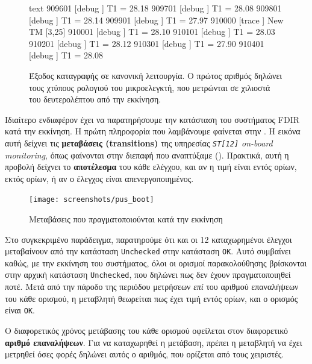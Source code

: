 \documentclass[a4paper,nobib]{tufte-book}
\begin{document}
\begin{figure}
\begin{cminted}{text}
909601  [debug  ] T1 = 28.18
909701  [debug  ] T1 = 28.08
909801  [debug  ] T1 = 28.14
909901  [debug  ] T1 = 27.97
910000  [trace  ] New TM [3,25]
910001  [debug  ] T1 = 28.10
910101  [debug  ] T1 = 28.03
910201  [debug  ] T1 = 28.12
910301  [debug  ] T1 = 27.90
910401  [debug  ] T1 = 28.08
\end{cminted}
\caption[Έξοδος καταγραφής σε κανονική λειτουργία]{Έξοδος καταγραφής σε κανονική λειτουργία. Ο πρώτος αριθμός δηλώνει τους χτύπους ρολογιού του μικροελεγκτή, που μετρώνται σε χιλιοστά του δευτερολέπτου από την εκκίνηση.}
\label{fig:lognominal}
\end{figure}

Ιδιαίτερο ενδιαφέρον έχει να παρατηρήσουμε την κατάσταση του συστήματος \acs{FDIR} κατά την εκκίνηση. Η πρώτη πληροφορία που λαμβάνουμε φαίνεται στην . Η εικόνα αυτή δείχνει τις \textbf{μεταβάσεις (transitions)} της υπηρεσίας \emph{\texttt{ST[12]} on-board monitoring}, όπως φαίνονται στην διεπαφή που αναπτύξαμε (). Πρακτικά, αυτή η προβολή δείχνει το \textbf{αποτέλεσμα} του κάθε ελέγχου, και αν η τιμή είναι εντός ορίων, εκτός ορίων, ή αν ο έλεγχος είναι απενεργοποιημένος.

\begin{figure}
	\texttt{[image: screenshots/pus\_boot]}
	\caption{Μεταβάσεις που πραγματοποιούνται κατά την εκκίνηση}
	\label{fig:pus_boot}
\end{figure}

Στο συγκεκριμένο παράδειγμα, παρατηρούμε ότι και οι 12 καταχωρημένοι έλεγχοι μεταβαίνουν από την κατάσταση \texttt{Unchecked} στην κατάσταση \texttt{OK}. Αυτό συμβαίνει καθώς, με την εκκίνηση του συστήματος, όλοι οι ορισμοί παρακολούθησης βρίσκονται στην αρχική κατάσταση \texttt{Unchecked}, που δηλώνει πως δεν έχουν πραγματοποιηθεί ποτέ. Μετά από την πάροδο της περιόδου μετρήσεων \emph{επί} του αριθμού επαναλήψεων του κάθε ορισμού, η μεταβλητή θεωρείται πως έχει τιμή εντός ορίων, και ο ορισμός είναι \texttt{OK}.

Ο διαφορετικός χρόνος μετάβασης του κάθε ορισμού οφείλεται στον διαφορετικό \textbf{αριθμό επαναλήψεων}. Για να καταχωρηθεί η μετάβαση, πρέπει η μεταβλητή να έχει μετρηθεί όσες φορές δηλώνει αυτός ο αριθμός, που ορίζεται από τους χειριστές.
\end{document}

